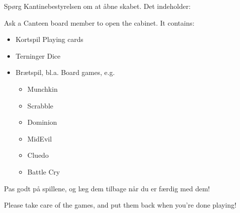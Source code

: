 \documentclass{article}
\begin{document}
\maketitle

\vspace{-0.5cm}
\dansk{}
\vspace{-1.5cm}
\english
{}

\LARGE

\dansk\noindent Spørg Kantinebestyrelsen om at åbne skabet.  Det
indeholder:

\english\noindent Ask a Canteen board member to open the cabinet.  It contains:

\begin{itemize}
\item \dansk Kortspil \english Playing cards
\item \dansk Terninger \english Dice
\item \dansk Brætspil, bl.a. \english Board games, e.g.
\dansk
\begin{itemize}
\item Munchkin
\item Scrabble
\item Dominion
\item MidEvil
\item Cluedo
\item Battle Cry
\end{itemize}
\end{itemize}

\dansk\noindent Pas godt på spillene, og læg dem tilbage når du er færdig med
dem!

\english\noindent Please take care of the games, and put them back when you're
done playing!

\dansk
\underskriv
\end{document}
